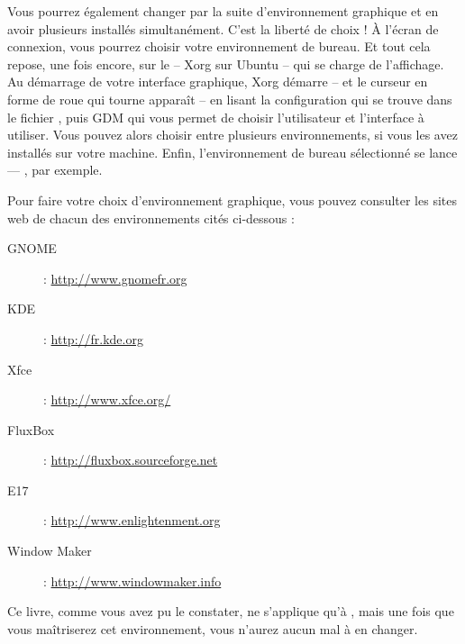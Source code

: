 Vous pourrez également changer par la suite d'environnement graphique et en avoir plusieurs installés simultanément. C'est la liberté de choix ! À l'écran de connexion, vous pourrez choisir votre environnement de bureau. Et tout cela repose, une fois encore, sur le  -- Xorg sur Ubuntu -- qui se charge de l'affichage. Au démarrage de votre interface graphique, Xorg démarre -- et le curseur en forme de roue qui tourne apparaît -- en lisant la configuration qui se trouve dans le fichier  , puis GDM qui vous permet de choisir l'utilisateur et l'interface à utiliser. Vous pouvez alors choisir entre plusieurs environnements, si vous les avez installés sur votre machine. Enfin, l'environnement de bureau sélectionné se lance --- , par exemple.\par
Pour faire votre choix d'environnement graphique, vous pouvez consulter les sites web de chacun des environnements cités ci-dessous :
\begin{description}
\item[GNOME] : \url{http://www.gnomefr.org}
\item[KDE] : \url{http://fr.kde.org}
\item[Xfce] : \url{http://www.xfce.org/}
\item[FluxBox] : \url{http://fluxbox.sourceforge.net}
\item[E17] : \url{http://www.enlightenment.org}
\item[Window Maker] : \url{http://www.windowmaker.info}
\end{description}
\begin{attention}
Ce livre, comme vous avez pu le constater, ne s'applique qu'à , mais une fois que vous maîtriserez cet environnement, vous n'aurez aucun mal à en changer.
\end{attention}
